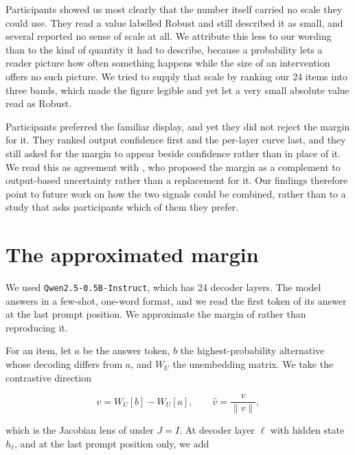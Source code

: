 \documentclass[sigconf]{acmart}
\begin{document}
Participants showed us most clearly that the number itself carried no scale they could use. They read a value
labelled Robust and still described it as small, and several reported no sense of scale at all. We attribute
this less to our wording than to the kind of quantity it had to describe, because a probability lets a reader
picture how often something happens while the size of an intervention offers no such picture. We tried to supply
that scale by ranking our 24 items into three bands, which made the figure legible and yet let a very small
absolute value read as Robust.

Participants preferred the familiar display, and yet they did not reject the margin for it. They ranked output
confidence first and the per-layer curve last, and they still asked for the margin to appear beside confidence
rather than in place of it. We read this as agreement with \citet{komanduriMeasuringMechanisticUncertainty2026},
who proposed the margin as a complement to output-based uncertainty rather than a replacement for it. Our
findings therefore point to future work on how the two signals could be combined, rather than to a study that
asks participants which of them they prefer.




\appendix

\section{The approximated margin}
\label{app:margin}

We used \texttt{Qwen2.5-0.5B-Instruct}, which has 24 decoder layers. The model answers in a few-shot,
one-word format, and we read the first token of its answer at the last prompt position. We approximate the
margin of \citet{komanduriMeasuringMechanisticUncertainty2026} rather than reproducing it.

For an item, let $a$ be the answer token, $b$ the highest-probability alternative whose decoding differs from
$a$, and $W_U$ the unembedding matrix. We take the contrastive direction

\begin{equation}
  v = W_U[b] - W_U[a], \qquad \hat{v} = \frac{v}{\lVert v \rVert},
\end{equation}

which is the Jacobian lens of \citet{komanduriMeasuringMechanisticUncertainty2026} under $J = I$. At decoder
layer $\ell$ with hidden state $h_\ell$, and at the last prompt position only, we add
\end{document}
